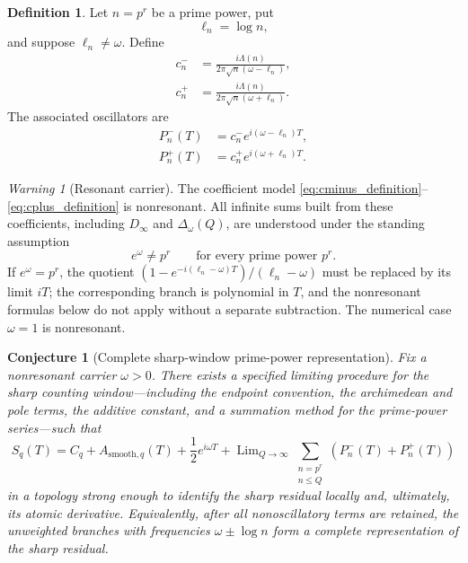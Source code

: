 \documentclass[11pt]{amsart}
\numberwithin{equation}{section}
\theoremstyle{plain}
\newtheorem{conjecture}[theorem]{Conjecture}
\theoremstyle{definition}
\newtheorem{definition}[theorem]{Definition}
\theoremstyle{remark}
\newtheorem{warning}[theorem]{Warning}
\newcommand{\1}{\mathbf{1}}
\begin{document}
\begin{definition}
\label{def:prime_power_coefficients}
Let \(n=p^r\) be a prime power, put
\begin{equation}
\ell_n=\log n,
\label{eq:elln_definition}
\end{equation}
and suppose \(\ell_n\neq\omega\).  Define
\begin{align}
c_n^-
&=
\frac{i\Lambda(n)}
{2\pi\sqrt n(\omega-\ell_n)},
\label{eq:cminus_definition}
\\
c_n^+
&=
\frac{i\Lambda(n)}
{2\pi\sqrt n(\omega+\ell_n)}.
\label{eq:cplus_definition}
\end{align}
The associated oscillators are
\begin{align}
P_n^-(T)
&=
c_n^-e^{i(\omega-\ell_n)T},
\label{eq:Pminus_definition}
\\
P_n^+(T)
&=
c_n^+e^{i(\omega+\ell_n)T}.
\label{eq:Pplus_definition}
\end{align}
\end{definition}

\begin{warning}[Resonant carrier]
\label{warn:prime_power_resonance}
The coefficient model
\eqref{eq:cminus_definition}--\eqref{eq:cplus_definition} is
nonresonant.  All infinite sums built from these coefficients, including
\(D_\infty\) and \(\Delta_\omega(Q)\), are understood under the standing
assumption
\begin{equation}
e^\omega\neq p^r
\qquad
\text{for every prime power }p^r.
\label{eq:nonresonant_carrier_assumption}
\end{equation}
If \(e^\omega=p^r\), the quotient
\((1-e^{-i(\ell_n-\omega)T})/(\ell_n-\omega)\) must be replaced by its
limit \(iT\); the corresponding branch is polynomial in \(T\), and the
nonresonant formulas below do not apply without a separate subtraction.
The numerical case \(\omega=1\) is nonresonant.
\end{warning}

\begin{conjecture}[Complete sharp-window prime-power representation]
\label{conj:sharp_window_prime_power_representation}
Fix a nonresonant carrier \(\omega>0\).  There exists a specified limiting
procedure for the sharp counting window---including the endpoint convention,
the archimedean and pole terms, the additive constant, and a summation method
for the prime-power series---such that
\begin{equation}
S_q(T)
=
C_q+
A_{\mathrm{smooth},q}(T)
+
\frac12e^{i\omega T}
+
\mathop{\mathrm{Lim}}_{Q\to\infty}
\sum_{\substack{n=p^r\\ n\leq Q}}
\left(P_n^-(T)+P_n^+(T)\right)
\label{eq:conjectural_sharp_decomposition}
\end{equation}
in a topology strong enough to identify the sharp residual locally and,
ultimately, its atomic derivative.  Equivalently, after all nonoscillatory
terms are retained, the unweighted branches with frequencies
\(\omega\pm\log n\) form a complete representation of the sharp residual.
\end{conjecture}
\end{document}
